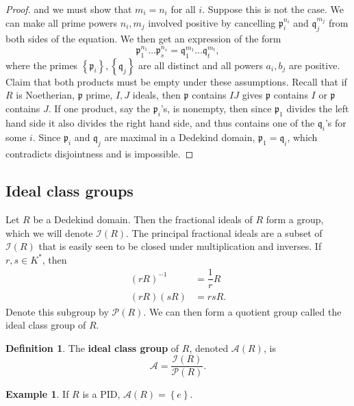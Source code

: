 \documentclass{article}
\newcommand{\rb}[1]{\left( #1 \right)}
\newcommand{\cb}[1]{\left\{ #1 \right\}}
\theoremstyle{definition}\newtheorem{definition}{Definition}[subsection]
\theoremstyle{definition}\newtheorem{remark}[definition]{Remark}
\theoremstyle{definition}\newtheorem*{example}{Example}
\theoremstyle{definition}\newtheorem*{note}{Note}
\begin{document}
\begin{proof}
and we must show that $ m_i = n_i $ for all $ i $. Suppose this is not the case. We can make all prime powers $ n_i, m_j $ involved positive by cancelling $ \mathfrak{p}_i^{n_i} $ and $ \mathfrak{q}_j^{m_j} $ from both sides of the equation. We then get an expression of the form
$$ \mathfrak{p}_1^{n_1} \dots \mathfrak{p}_s^{n_s} = \mathfrak{q}_1^{m_1} \dots \mathfrak{q}_t^{m_t}, $$
where the primes $ \cb{\mathfrak{p}_i}, \cb{\mathfrak{q}_j} $ are all distinct and all powers $ a_i, b_j $ are positive. Claim that both products must be empty under these assumptions. Recall that if $ R $ is Noetherian, $ \mathfrak{p} $ prime, $ I, J $ ideals, then $ \mathfrak{p} $ contains $ IJ $ gives $ \mathfrak{p} $ contains $ I $ or $ \mathfrak{p} $ contains $ J $. If one product, say the $ \mathfrak{p}_i $'s, is nonempty, then since $ \mathfrak{p}_1 $ divides the left hand side it also divides the right hand side, and thus contains one of the $ \mathfrak{q}_i $'s for some $ i $. Since $ \mathfrak{p}_i $ and $ \mathfrak{q}_j $ are maximal in a Dedekind domain, $ \mathfrak{p}_1 = \mathfrak{q}_i $, which contradicts disjointness and is impossible.
\end{proof}

\subsection{Ideal class groups}

Let $ R $ be a Dedekind domain. Then the fractional ideals of $ R $ form a group, which we will denote $ \mathcal{I}\rb{R} $. The principal fractional ideals are a subset of $ \mathcal{I}\rb{R} $ that is easily seen to be closed under multiplication and inverses. If $ r, s \in K^* $, then
\begin{align*}
\rb{rR}^{-1} & = \dfrac{1}{r}R \\
\rb{rR}\rb{sR} & = rsR.
\end{align*}
Denote this subgroup by $ \mathcal{P}\rb{R} $. We can then form a quotient group called the ideal class group of $ R $.

\begin{definition}
The \textbf{ideal class group} of $ R $, denoted $ \mathcal{A}\rb{R} $, is
$$ \mathcal{A} = \dfrac{\mathcal{I}\rb{R}}{\mathcal{P}\rb{R}}. $$
\end{definition}

\begin{example}
If $ R $ is a PID, $ \mathcal{A}\rb{R} = \cb{e} $.
\end{example}
\end{document}
